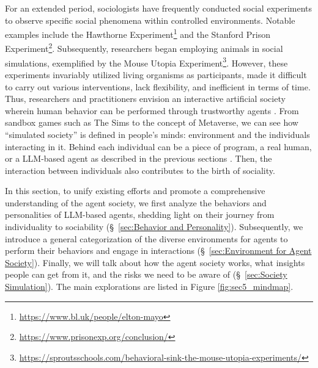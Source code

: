 For an extended period, sociologists have frequently conducted social experiments to observe specific social phenomena within controlled environments. 
Notable examples include the Hawthorne Experiment\footnote{\href{https://www.bl.uk/people/elton-mayo}{https://www.bl.uk/people/elton-mayo}} and the Stanford Prison Experiment\footnote{\href{https://www.prisonexp.org/conclusion/}{https://www.prisonexp.org/conclusion/}}. 
Subsequently, researchers began employing animals in social simulations, exemplified by the Mouse Utopia Experiment\footnote{\href{https://sproutsschools.com/behavioral-sink-the-mouse-utopia-experiments/}{https://sproutsschools.com/behavioral-sink-the-mouse-utopia-experiments/}}. 
However, these experiments invariably utilized living organisms as participants, made it difficult to carry out various interventions, lack flexibility, and inefficient in terms of time.
Thus, researchers and practitioners envision an interactive artificial society wherein human behavior can be performed through trustworthy agents \cite{DBLP:books/sp/Costa19}.
From sandbox games such as The Sims to the concept of Metaverse, we can see how ``simulated society'' is defined in people's minds: environment and the individuals interacting in it. 
Behind each individual can be a piece of program, a real human, or a LLM-based agent as described in the previous sections \cite{DBLP:journals/corr/abs-2304-03442,WIMMER2021EVE, DBLP:journals/corr/abs-2110-05352}.
Then, the interaction between individuals also contributes to the birth of sociality.

In this section, to unify existing efforts and promote a comprehensive understanding of the agent society, we first analyze the behaviors and personalities of LLM-based agents, shedding light on their journey from individuality to sociability (\S \ \ref{sec:Behavior and Personality}). 
Subsequently, we introduce a general categorization of the diverse environments for agents to perform their behaviors and engage in interactions (\S \ \ref{sec:Environment for Agent Society}). 
Finally, we will talk about how the agent society works, what insights people can get from it, and the risks we need to be aware of (\S \ \ref{sec:Society Simulation}). The main explorations are listed in Figure \ref{fig:sec5_mindmap}.

